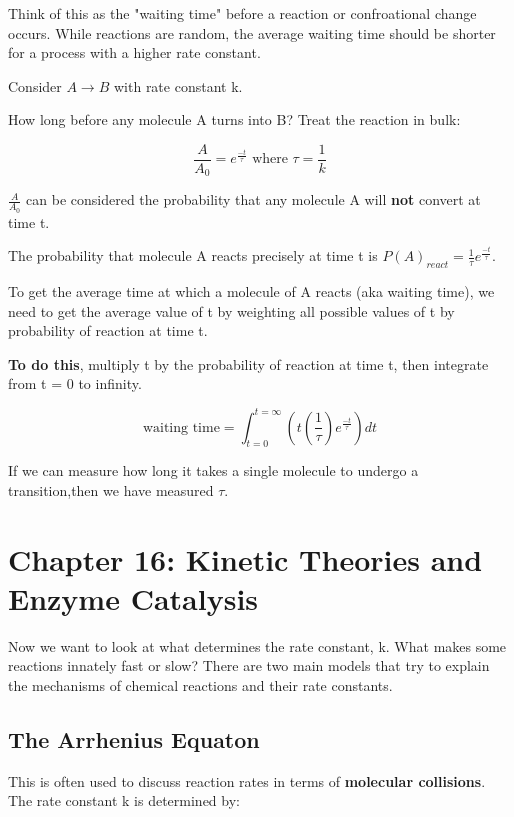 \documentclass[12pt, letterpaper]{article}
\begin{document}
Think of this as the "waiting time" before a reaction or confroational change occurs. 
While reactions are random, the average waiting time should be shorter for a process with a higher rate constant. 

Consider \( A \longrightarrow B \) with rate constant k. 

How long before any molecule A turns into B? Treat the reaction in bulk: 

\begin{equation}
    \frac{A}{A_0} = e^{\frac{-t}{\tau}} \text{ where } \tau = \frac{1}{k}
\end{equation}

$\frac{A}{A_0} $ can be considered the probability that any molecule A will \textbf{not} convert at time t. 

The probability that molecule A reacts precisely at time t is \( P(A)_{react} = \frac{1}{\tau} e^{\frac{-t}{\tau}} \).

To get the average time at which a molecule of A reacts (aka waiting time), we need
to get the average value of t by weighting all possible values of t by probability of reaction at time t. 

\textbf{To do this}, multiply t by the probability of reaction at time t, then integrate from t = 0 to infinity. 

\begin{equation}
    \text{waiting time} = \int_{t = 0}^{t = \infty}(t(\frac{1}{\tau})e^{\frac{-t}{\tau}})dt
\end{equation}

If we can measure how long it takes a single molecule to undergo a transition,then we have measured $\tau$. 

\newpage

\section*{Chapter 16: Kinetic Theories and Enzyme Catalysis}
Now we want to look at what determines the rate constant, k. What makes some reactions innately fast or slow?
There are two main models that try to explain the mechanisms of chemical reactions and their rate constants. 

\subsection*{The Arrhenius Equaton}

This is often used to discuss reaction rates in terms of \textbf{molecular collisions}. 
The rate constant k is determined by:
\end{document}
